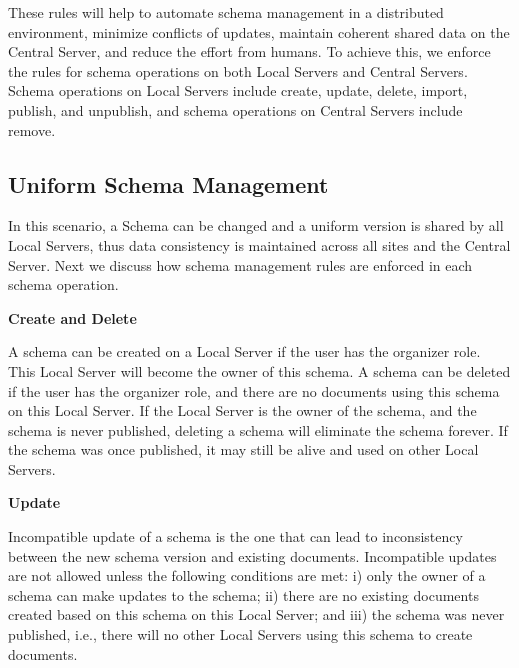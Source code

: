 \documentclass{singlecol-new}
\theoremstyle{TH}{
\newtheorem{lemma}{Lemma}
\newtheorem{theorem}[lemma]{Theorem}
\newtheorem{corrolary}[lemma]{Corrolary}
\newtheorem{conjecture}[lemma]{Conjecture}
\newtheorem{proposition}[lemma]{Proposition}
\newtheorem{claim}[lemma]{Claim}
\newtheorem{stheorem}[lemma]{Wrong Theorem}
\newtheorem{algorithm}{Algorithm}
}
\theoremstyle{THrm}{
\newtheorem{definition}{Definition}[section]
\newtheorem{question}{Question}[section]
\newtheorem{remark}{Remark}
\newtheorem{scheme}{Scheme}
}
\theoremstyle{THhit}{
\newtheorem{case}{Case}[section]
}
\begin{document}
These rules will help to automate schema management in a distributed
environment, minimize conflicts of updates, maintain coherent shared
data on the Central Server, and reduce the effort from humans.  To
achieve this, we enforce the rules for schema operations on both
Local Servers and Central Servers. Schema operations on Local
Servers include create, update, delete, import, publish, and
unpublish, and schema operations on Central Servers include remove.

\subsection{Uniform Schema Management}


In this scenario, a Schema can be changed and a uniform version is
shared by all Local Servers, thus data consistency is maintained
across all sites and the Central Server.   Next we discuss how
schema management rules are enforced in each schema operation.

\textbf{Create and Delete}

A schema can be created on a Local Server if the user has the
organizer role. This Local Server will become the owner of this
schema. A schema can be  deleted  if the user has the organizer
role, and there are no documents using this schema on this Local
Server.  If the Local Server is the owner of the schema, and the
schema is never published,  deleting a schema will eliminate the
schema forever. If the schema was once published, it may still be
alive and used on other Local Servers.

\textbf{Update}

Incompatible update of a schema is the one that can lead to
inconsistency between the new schema version and existing documents.
Incompatible updates are not allowed unless the following conditions
are met:  i) only the owner of a schema can make updates to the
schema; ii) there are no existing documents created based on  this
schema on this Local Server; and iii) the schema was never
published, i.e., there will no other Local Servers using this schema
to create documents.
\end{document}
